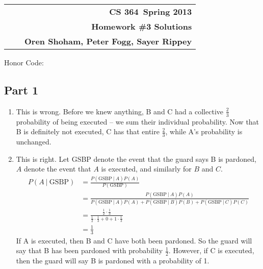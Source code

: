 \documentclass[11pt]{article}
\makeatletter
\newcommand{\course}{CS 364}
\newcommand{\semester}{Spring 2013}
\newcommand{\hwk}{Homework \#3 Solutions}
\newcommand{\student}{Oren Shoham, Peter Fogg, Sayer Rippey}
\renewcommand\maketitle{
  \begin{center}
    \begin{tabular*}{6.44in}{l @{\extracolsep{\fill}}c r}
      \bfseries  &  & \bfseries \course ~\semester \\
      \bfseries&  & \bfseries  \hwk  \\
      \bfseries   &   &  \bfseries \student \\ 
    \end{tabular*}
\end{center} }
\makeatother
\begin{document}
\maketitle
\thispagestyle{plain}


\noindent Honor Code: 

\subsection*{Part 1}
\begin{enumerate}
\item This is wrong. Before we knew anything, B and C had a collective $\frac{2}{3}$ probability of being executed -- we sum their individual probability. Now that B is definitely not executed, C has that entire $\frac{2}{3}$, while A's probability is unchanged.
\item This is right. Let GSBP denote the event that the guard says B is pardoned, $A$ denote the event that $A$ is executed, and similarly for $B$ and $C$.
  \begin{align*}
    P(A\ |\ \text{GSBP}) &= \frac{P(\text{GSBP}\ |\ A)P(A)}{P(\text{GSBP})} \\
    &= \frac{P(\text{GSBP}\ |\ A)P(A)}{P(\text{GSBP}\ |\ A)P(A) + P(\text{GSBP}\ |\ B)P(B) + P(\text{GSBP}\ |\ C)P(C)} \\
    &= \frac{\frac{1}{2} \cdot \frac{1}{3}}{\frac{1}{2} \cdot \frac{1}{3} + 0 + 1 \cdot \frac{1}{3}} \\
    &= \frac{1}{3}
  \end{align*}
  If A is executed, then B and C have both been pardoned. So the guard will say that B has been pardoned with probability $\frac{1}{2}$. However, if C is executed, then the guard will say B is pardoned with a probability of 1.
\end{enumerate}
\end{document}
